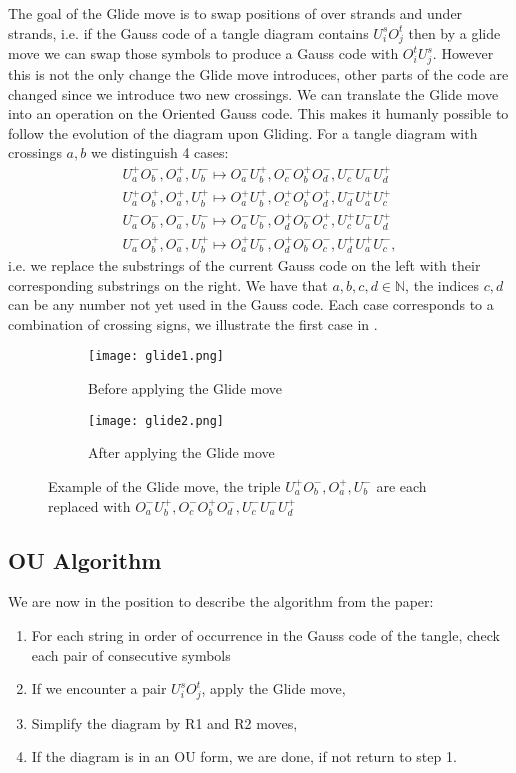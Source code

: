 The goal of the Glide move is to swap positions of over strands and under strands, i.e. if the Gauss code of a tangle diagram contains $U^s_iO^t_j$ then by a glide move we can swap those symbols to produce a Gauss code with $O^t_iU^s_j$. However this is not the only change the Glide move introduces, other parts of the code are changed since we introduce two new crossings. We can translate the Glide move into an operation on the Oriented Gauss code. This makes it humanly possible to follow the evolution of the diagram upon Gliding. For a tangle diagram with crossings $a,b$ we distinguish 4 cases:
\begin{align*}
U_a^+O_b^-,O_a^+,U_b^-\mapsto O_a^-U_b^+,O_{c}^-O_b^+O_{d}^-,U_{c}^-U_a^-U_{d}^+\\[0.25cm]
U_a^+O_b^+,O_a^+,U_b^+ \mapsto O_a^+U_b^+,O_{c}^+O_b^+O_{d}^+,U_{d}^-U_a^+U_{c}^+\\[0.25cm]
U_a^-O_b^-,O_a^-,U_b^-\mapsto O_a^-U_b^-,O_{d}^+O_b^-O_{c}^+,U_{c}^+U_a^-U_{d}^+\\[0.25cm]
U_a^-O_b^+,O_a^-,U_b^+ \mapsto O_a^+U_b^-,O_{d}^+O_b^-O_{c}^-,U_{d}^+U_a^+U_{c}^-,
\end{align*}
i.e. we replace the substrings of the current Gauss code on the left with their corresponding substrings on the right. We have that $a,b,c,d\in\mathbb N$, the indices $c,d$ can be any number not yet used in the Gauss code. Each case corresponds to a combination of crossing signs, we illustrate the first case in .
\begin{figure}[h!]
\centering
\begin{subfigure}{0.40\textwidth}
\centering
\texttt{[image: glide1.png]}
\caption{Before applying the Glide move}
\label{fig:glide1}
\end{subfigure}
\hspace{1cm}
\begin{subfigure}{0.40\textwidth}
\centering
\texttt{[image: glide2.png]}
\caption{After applying the Glide move}
\label{fig:glide2}
\end{subfigure}
\caption{Example of the Glide move, the triple $U_a^+O_b^-,O_a^+,U_b^-$ are each replaced with $O_a^-U_b^+,O_{c}^-O_b^+O_{d}^-,U_{c}^-U_a^-U_{d}^+$}
\label{fig:glide}
\end{figure}

\subsection{OU Algorithm}
We are now in the position to describe the algorithm from the paper:
\begin{enumerate}
\item For each string in order of occurrence in the Gauss code of the tangle, check each pair of consecutive symbols 
\item If we encounter a pair $U^s_iO^t_j$, apply the Glide move,
\item Simplify the diagram by R1 and R2 moves,
\item If the diagram is in an OU form, we are done, if not return to step 1.
\end{enumerate}

